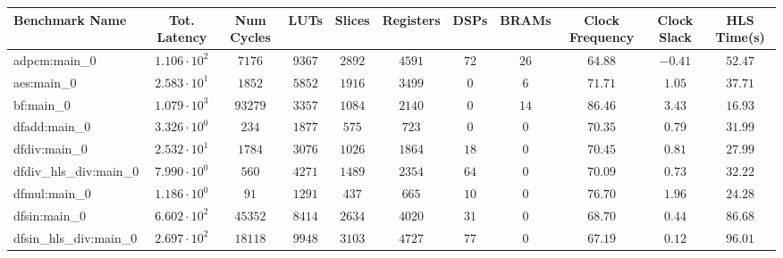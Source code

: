 \begin{tabular}{|l|c|c|c|c|c|c|c|c|c|c|}
\hline
Benchmark Name          & Tot. Latency           & Num Cycles & LUTs      & Slices    & Registers & DSPs    & BRAMs   & Clock Frequency & Clock Slack & HLS Time(s) \\
\hline
adpcm:main\_0           & $ 1.106 \cdot 10^{2} $ & $ 7176   $ & $ 9367  $ & $ 2892  $ & $ 4591  $ & $ 72  $ & $ 26  $ & $ 64.88       $ & $ -0.41   $ & $ 52.47   $ \\
aes:main\_0             & $ 2.583 \cdot 10^{1} $ & $ 1852   $ & $ 5852  $ & $ 1916  $ & $ 3499  $ & $ 0   $ & $ 6   $ & $ 71.71       $ & $ 1.05    $ & $ 37.71   $ \\
bf:main\_0              & $ 1.079 \cdot 10^{3} $ & $ 93279  $ & $ 3357  $ & $ 1084  $ & $ 2140  $ & $ 0   $ & $ 14  $ & $ 86.46       $ & $ 3.43    $ & $ 16.93   $ \\
dfadd:main\_0           & $ 3.326 \cdot 10^{0} $ & $ 234    $ & $ 1877  $ & $ 575   $ & $ 723   $ & $ 0   $ & $ 0   $ & $ 70.35       $ & $ 0.79    $ & $ 31.99   $ \\
dfdiv:main\_0           & $ 2.532 \cdot 10^{1} $ & $ 1784   $ & $ 3076  $ & $ 1026  $ & $ 1864  $ & $ 18  $ & $ 0   $ & $ 70.45       $ & $ 0.81    $ & $ 27.99   $ \\
dfdiv\_hls\_div:main\_0 & $ 7.990 \cdot 10^{0} $ & $ 560    $ & $ 4271  $ & $ 1489  $ & $ 2354  $ & $ 64  $ & $ 0   $ & $ 70.09       $ & $ 0.73    $ & $ 32.22   $ \\
dfmul:main\_0           & $ 1.186 \cdot 10^{0} $ & $ 91     $ & $ 1291  $ & $ 437   $ & $ 665   $ & $ 10  $ & $ 0   $ & $ 76.70       $ & $ 1.96    $ & $ 24.28   $ \\
dfsin:main\_0           & $ 6.602 \cdot 10^{2} $ & $ 45352  $ & $ 8414  $ & $ 2634  $ & $ 4020  $ & $ 31  $ & $ 0   $ & $ 68.70       $ & $ 0.44    $ & $ 86.68   $ \\
dfsin\_hls\_div:main\_0 & $ 2.697 \cdot 10^{2} $ & $ 18118  $ & $ 9948  $ & $ 3103  $ & $ 4727  $ & $ 77  $ & $ 0   $ & $ 67.19       $ & $ 0.12    $ & $ 96.01   $ \\

\end{tabular}
